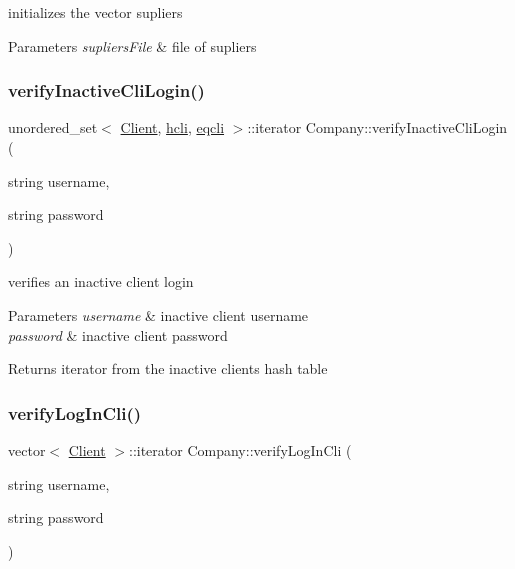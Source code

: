 initializes the vector supliers 


\begin{DoxyParams}{Parameters}
{\em supliers\+File} & file of supliers \\
\hline
\end{DoxyParams}
\hypertarget{class_company_ae861811b274bb4504cba29f9ee29b542}{}\label{class_company_ae861811b274bb4504cba29f9ee29b542} 
\subsubsection{\texorpdfstring{verify\+Inactive\+Cli\+Login()}{verifyInactiveCliLogin()}}
{\footnotesize\ttfamily unordered\+\_\+set$<$ \hyperlink{class_client}{Client}, \hyperlink{structhcli}{hcli}, \hyperlink{structeqcli}{eqcli} $>$\+::iterator Company\+::verify\+Inactive\+Cli\+Login (\begin{DoxyParamCaption}\item[{string}]{username,  }\item[{string}]{password }\end{DoxyParamCaption})}



verifies an inactive client login 


\begin{DoxyParams}{Parameters}
{\em username} & inactive client username\\
\hline
{\em password} & inactive client password\\
\hline
\end{DoxyParams}
\begin{DoxyReturn}{Returns}
iterator from the inactive clients hash table 
\end{DoxyReturn}
\hypertarget{class_company_ae09dab4c6a0d26207cdeffd0d5adcf8f}{}\label{class_company_ae09dab4c6a0d26207cdeffd0d5adcf8f} 
\subsubsection{\texorpdfstring{verify\+Log\+In\+Cli()}{verifyLogInCli()}}
{\footnotesize\ttfamily vector$<$ \hyperlink{class_client}{Client} $>$\+::iterator Company\+::verify\+Log\+In\+Cli (\begin{DoxyParamCaption}\item[{string}]{username,  }\item[{string}]{password }\end{DoxyParamCaption})}



